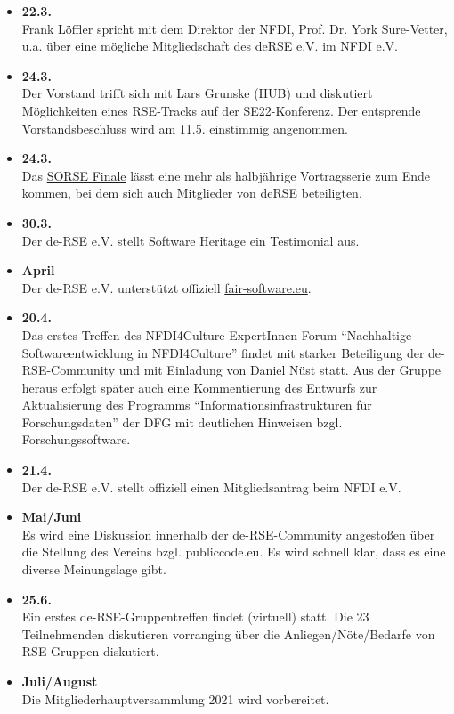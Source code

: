 \begin{itemize}
  \item \textbf{22.3.}\\Frank Löffler spricht mit dem Direktor der NFDI, Prof. Dr. York Sure-Vetter, u.a. über eine mögliche Mitgliedschaft des deRSE e.V. im NFDI e.V.
  \item \textbf{24.3.}\\Der Vorstand trifft sich mit Lars Grunske (HUB) und diskutiert Möglichkeiten eines RSE-Tracks auf der SE22-Konferenz. Der entsprende Vorstandsbeschluss wird am 11.5. einstimmig angenommen.
  \item \textbf{24.3.}\\Das \href{https://sorse.github.io/programme/finale/}{SORSE Finale} lässt eine mehr als halbjährige Vortragsserie zum Ende kommen, bei dem sich auch Mitglieder von deRSE beteiligten.
  \item \textbf{30.3.}\\Der de-RSE e.V. stellt \href{https://www.softwareheritage.org}{Software Heritage} ein \href{https://www.softwareheritage.org/2021/03/30/society-for-research-software-in-germany-de-rse/}{Testimonial} aus.
  \item \textbf{April}\\Der de-RSE e.V. unterstützt offiziell \href{https://fair-software.eu/endorse}{fair-software.eu}.
  \item \textbf{20.4.}\\Das erstes Treffen des NFDI4Culture ExpertInnen-Forum ``Nachhaltige Softwareentwicklung in NFDI4Culture'' findet mit starker Beteiligung der de-RSE-Community und mit Einladung von Daniel Nüst statt. Aus der Gruppe heraus erfolgt später auch eine Kommentierung des Entwurfs zur Aktualisierung des Programms ``Informationsinfrastrukturen für Forschungsdaten'' der DFG mit deutlichen Hinweisen bzgl. Forschungssoftware.
  \item \textbf{21.4.}\\Der de-RSE e.V. stellt offiziell einen Mitgliedsantrag beim NFDI e.V.
  \item \textbf{Mai/Juni}\\Es wird eine Diskussion innerhalb der de-RSE-Community angestoßen über die Stellung des Vereins bzgl. publiccode.eu. Es wird schnell klar, dass es eine diverse Meinungslage gibt.
  \item \textbf{25.6.}\\Ein erstes de-RSE-Gruppentreffen findet (virtuell) statt. Die 23 Teilnehmenden diskutieren vorranging über die Anliegen/Nöte/Bedarfe von RSE-Gruppen diskutiert.
  \item \textbf{Juli/August}\\Die Mitgliederhauptversammlung 2021 wird vorbereitet.

\end{itemize}
